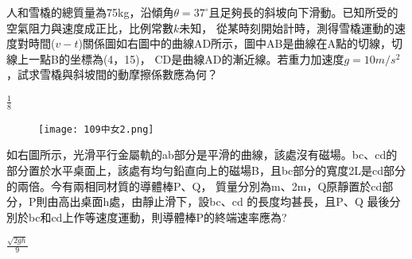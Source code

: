 \documentclass[cn,10pt,math=newtx]{elegantbook}
\begin{document}
\begin{example}
  人和雪橇的總質量為75kg，沿傾角$\theta=37^\circ $且足夠長的斜坡向下滑動。已知所受的空氣阻力與速度成正比，比例常數$k$未知，
  從某時刻開始計時，測得雪橇運動的速度對時間($v-t$)關係圖如右圖中的曲線AD所示，圖中AB是曲線在A點的切線，切線上一點B的坐標為(4，15)，
  CD是曲線AD的漸近線。若重力加速度$g=10m/s^2$，試求雪橇與斜坡間的動摩擦係數應為何？\\
  \rightline{[台中女中教甄109]}
\end{example}
\begin{solution}
  $\frac{1}{8}$
\end{solution}
\begin{figure}[htbp]
  \flushright
  \texttt{[image: 109中女2.png]}
\end{figure}
\newpage
\begin{example}
  如右圖所示，光滑平行金屬軌的ab部分是平滑的曲線，該處沒有磁場。bc、cd的部分置於水平桌面上，該處有均勻鉛直向上的磁場B，且bc部分的寬度2L是cd部分的兩倍。今有兩相同材質的導體棒P、Q，
  質量分別為m、2m，Q原靜置於cd部分，P則由高出桌面h處，由靜止滑下，設bc、cd 的長度均甚長，且P、Q 最後分別於bc和cd上作等速度運動，則導體棒P的終端速率應為?\\
  \rightline{[台中女中教甄109]}
\end{example}

\begin{solution}
  $\frac{\sqrt{2gh}}{9}$
\end{solution}
\end{document}
